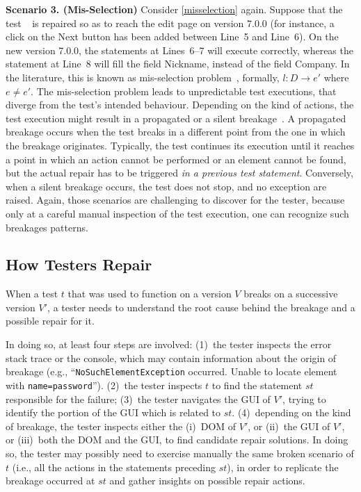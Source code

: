 \noindent
\textbf{Scenario 3. (Mis-Selection)} Consider \autoref{misselection} again. 
Suppose that the test~\textcircled{} is repaired so as to reach the edit page on version 7.0.0 (for instance, a click on the Next button has been added between Line~5 and Line~6). On the new version 7.0.0, the statements at Lines~6--7 will execute correctly, whereas the statement at Line~8 will fill the field Nickname, instead of the field Company. In the literature, this is known as mis-selection problem~\cite{Choudhary:2011:WWA:2002931.2002935}, formally, $l: D \rightarrow e'$ where $e \ne e'$. The mis-selection problem leads to unpredictable test executions, that diverge from the test's intended behaviour. Depending on the kind of actions, the test execution might result in a propagated or a silent breakage~\cite{Hammoudi-2016-ICST}. A propagated breakage occurs when the test breaks in a different point from the one in which the breakage originates. Typically, the test continues its execution until it reaches a point in which an action cannot be performed or an element cannot be found, but the actual repair has to be triggered \textit{in a previous test statement}. Conversely, when a silent breakage occurs, the test does not stop, and no exception are raised. Again, those scenarios are challenging to discover for the tester, because only at a careful manual inspection of the test execution, one can recognize such breakages patterns.


\subsection{How Testers Repair}

When a test $t$ that was used to function on a version $V$  breaks on a successive version $V'$, a tester needs to understand the root cause behind the breakage and a possible repair for it. 

In doing so, at least four steps are involved: 
(1)~the tester inspects the error stack trace or the console, which may contain information about the origin of breakage (e.g., ``\texttt{NoSuchElementException} occurred. Unable to locate element with \mbox{\texttt{name=password}}''). 
(2)~the tester inspects $t$ to find the statement $st$ responsible for the failure; %
(3)~the tester navigates the GUI of $V'$, trying to identify the portion of the GUI which is related to $st$. 
(4)~depending on the kind of breakage, the tester inspects either the (i)~DOM of $V'$, or (ii)~the GUI of $V'$, or (iii)~both the DOM and the GUI, to find candidate repair solutions. In doing so, the tester may possibly need to exercise manually the same broken scenario of $t$ (i.e., all the actions in the statements preceding $st$), in order to replicate the breakage occurred at $st$ and gather insights on possible repair actions.

